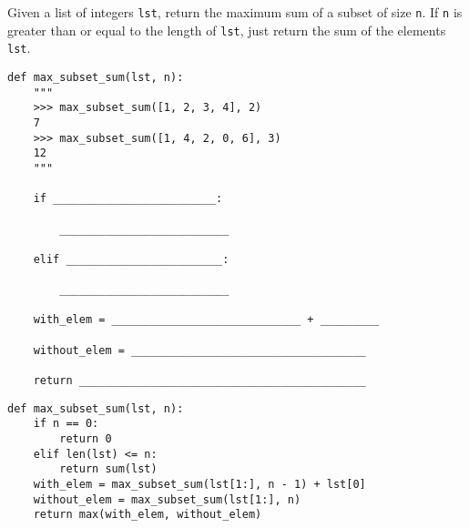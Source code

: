 \question
Given a list of integers \lstinline{lst}, return the maximum sum of a subset of size \lstinline{n}. If \lstinline{n} is greater than or equal to the length of \lstinline{lst}, just return the sum of the elements \lstinline{lst}.

\begin{lstlisting}
def max_subset_sum(lst, n):
    """
    >>> max_subset_sum([1, 2, 3, 4], 2)
    7
    >>> max_subset_sum([1, 4, 2, 0, 6], 3)
    12
    """

    if _________________________:

        __________________________

    elif ________________________:

        __________________________

    with_elem = _____________________________ + _________

    without_elem = ____________________________________
    
    return ____________________________________________
\end{lstlisting}

\begin{solution}
\begin{lstlisting}
def max_subset_sum(lst, n):
    if n == 0:
        return 0
    elif len(lst) <= n:
        return sum(lst)
    with_elem = max_subset_sum(lst[1:], n - 1) + lst[0]
    without_elem = max_subset_sum(lst[1:], n)
    return max(with_elem, without_elem)
\end{lstlisting}
\end{solution}